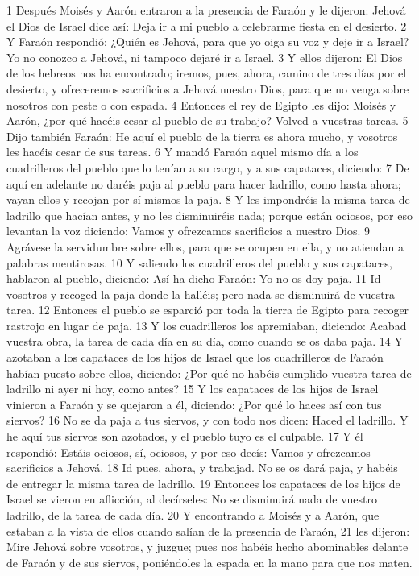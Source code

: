 1 Después Moisés y Aarón entraron a la presencia de Faraón y le dijeron: Jehová el Dios de Israel dice así: Deja ir a mi pueblo a celebrarme fiesta en el desierto.
2 Y Faraón respondió: ¿Quién es Jehová, para que yo oiga su voz y deje ir a Israel? Yo no conozco a Jehová, ni tampoco dejaré ir a Israel.
3 Y ellos dijeron: El Dios de los hebreos nos ha encontrado; iremos, pues, ahora, camino de tres días por el desierto, y ofreceremos sacrificios a Jehová nuestro Dios, para que no venga sobre nosotros con peste o con espada.
4 Entonces el rey de Egipto les dijo: Moisés y Aarón, ¿por qué hacéis cesar al pueblo de su trabajo? Volved a vuestras tareas.
5 Dijo también Faraón: He aquí el pueblo de la tierra es ahora mucho, y vosotros les hacéis cesar de sus tareas.
6 Y mandó Faraón aquel mismo día a los cuadrilleros del pueblo que lo tenían a su cargo, y a sus capataces, diciendo:
7 De aquí en adelante no daréis paja al pueblo para hacer ladrillo, como hasta ahora; vayan ellos y recojan por sí mismos la paja.
8 Y les impondréis la misma tarea de ladrillo que hacían antes, y no les disminuiréis nada; porque están ociosos, por eso levantan la voz diciendo: Vamos y ofrezcamos sacrificios a nuestro Dios.
9 Agrávese la servidumbre sobre ellos, para que se ocupen en ella, y no atiendan a palabras mentirosas.
10 Y saliendo los cuadrilleros del pueblo y sus capataces, hablaron al pueblo, diciendo: Así ha dicho Faraón: Yo no os doy paja.
11 Id vosotros y recoged la paja donde la halléis; pero nada se disminuirá de vuestra tarea.
12 Entonces el pueblo se esparció por toda la tierra de Egipto para recoger rastrojo en lugar de paja.
13 Y los cuadrilleros los apremiaban, diciendo: Acabad vuestra obra, la tarea de cada día en su día, como cuando se os daba paja.
14 Y azotaban a los capataces de los hijos de Israel que los cuadrilleros de Faraón habían puesto sobre ellos, diciendo: ¿Por qué no habéis cumplido vuestra tarea de ladrillo ni ayer ni hoy, como antes?
15 Y los capataces de los hijos de Israel vinieron a Faraón y se quejaron a él, diciendo: ¿Por qué lo haces así con tus siervos?
16 No se da paja a tus siervos, y con todo nos dicen: Haced el ladrillo. Y he aquí tus siervos son azotados, y el pueblo tuyo es el culpable.
17 Y él respondió: Estáis ociosos, sí, ociosos, y por eso decís: Vamos y ofrezcamos sacrificios a Jehová.
18 Id pues, ahora, y trabajad. No se os dará paja, y habéis de entregar la misma tarea de ladrillo.
19 Entonces los capataces de los hijos de Israel se vieron en aflicción, al decírseles: No se disminuirá nada de vuestro ladrillo, de la tarea de cada día.
20 Y encontrando a Moisés y a Aarón, que estaban a la vista de ellos cuando salían de la presencia de Faraón,
21 les dijeron: Mire Jehová sobre vosotros, y juzgue; pues nos habéis hecho abominables delante de Faraón y de sus siervos, poniéndoles la espada en la mano para que nos maten.

